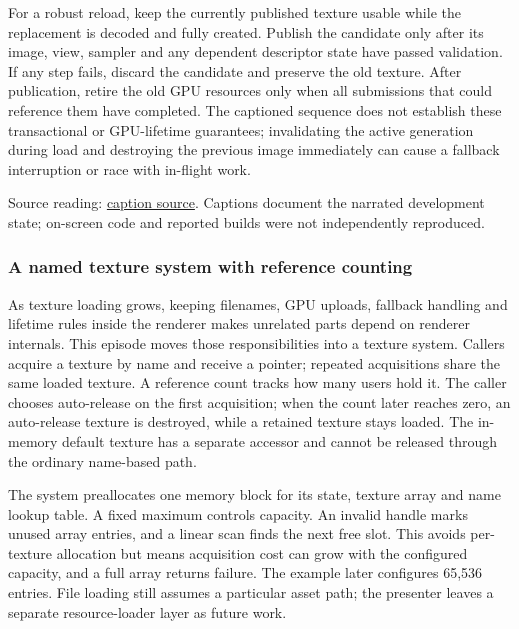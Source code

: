 For a robust reload, keep the currently published texture usable while the replacement is decoded and fully created. Publish the candidate only after its image, view, sampler and any dependent descriptor state have passed validation. If any step fails, discard the candidate and preserve the old texture. After publication, retire the old GPU resources only when all submissions that could reference them have completed. The captioned sequence does not establish these transactional or GPU-lifetime guarantees; invalidating the active generation during load and destroying the previous image immediately can cause a fallback interruption or race with in-flight work.

Source reading: \href{https://www.youtube.com/watch?v=2IxHj52-Kag}{caption source}. Captions document the narrated development state; on-screen code and reported builds were not independently reproduced.

\subsubsection{A named texture system with reference counting}\label{06-engine-ii-ch027-a-named-texture-system-with-reference-counting}

\hypertarget{06-engine-ii-ch027-a-named-texture-system-with-reference-counting}{}

As texture loading grows, keeping filenames, GPU uploads, fallback handling and lifetime rules inside the renderer makes unrelated parts depend on renderer internals. This episode moves those responsibilities into a texture system. Callers acquire a texture by name and receive a pointer; repeated acquisitions share the same loaded texture. A reference count tracks how many users hold it. The caller chooses auto-release on the first acquisition; when the count later reaches zero, an auto-release texture is destroyed, while a retained texture stays loaded. The in-memory default texture has a separate accessor and cannot be released through the ordinary name-based path.

The system preallocates one memory block for its state, texture array and name lookup table. A fixed maximum controls capacity. An invalid handle marks unused array entries, and a linear scan finds the next free slot. This avoids per-texture allocation but means acquisition cost can grow with the configured capacity, and a full array returns failure. The example later configures 65,536 entries. File loading still assumes a particular asset path; the presenter leaves a separate resource-loader layer as future work.

